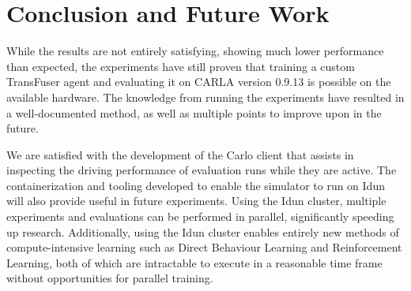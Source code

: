 \chapter{Conclusion and Future Work}
\label{chap:conclusion}


While the results are not entirely satisfying,
showing much lower performance than expected,
the experiments have still proven that training a custom TransFuser agent
and evaluating it on CARLA version 0.9.13
is possible on the available hardware.
The knowledge from running the experiments
have resulted in a well-documented method,
as well as multiple points to improve upon in the future.

We are satisfied with the development of the Carlo client
that assists in inspecting the driving performance of evaluation runs while they are active.
The containerization and tooling developed to enable the simulator to run on Idun
will also provide useful in future experiments.
Using the Idun cluster,
multiple experiments and evaluations can be performed in parallel,
significantly speeding up research.
Additionally, using the Idun cluster enables entirely new methods of compute-intensive learning
such as Direct Behaviour Learning and Reinforcement Learning,
both of which are intractable to execute in a reasonable time frame without opportunities for parallel training.
